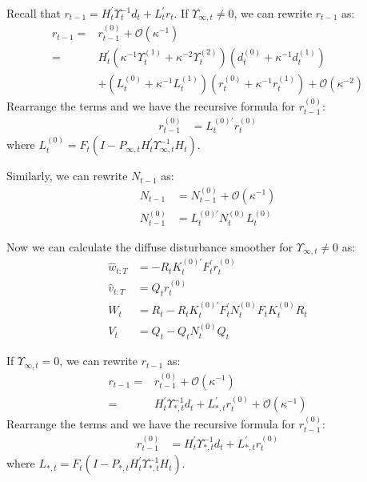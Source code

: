 \documentclass[12pt]{article}
\numberwithin{equation}{section}
\begin{document}
Recall that $r_{t-1} = H_t^{'}\Upsilon_t^{-1}d_t + L_t^{'}r_t$. If $\Upsilon_{\infty,t}\neq0$, we can rewrite $r_{t-1}$ as:
\begin{align*}
    r_{t-1} =& r_{t-1}^{(0)} + \mathcal{O}(\kappa^{-1}) \\
    =& H_t^{'}(\kappa^{-1}\Upsilon_t^{(1)}+\kappa^{-2}\Upsilon_{t}^{(2)})(d_t^{(0)} + \kappa^{-1}d_t^{(1)}) \\
    &+ (L_t^{(0)} + \kappa^{-1}L_t^{(1)})(r_t^{(0)}+\kappa^{-1}r_t^{(1)}) + \mathcal{O}(\kappa^{-2})
\end{align*}
Rearrange the terms and we have the recursive formula for $r_{t-1}^{(0)}$:
\begin{align}
    r_{t-1}^{(0)} &= L_t^{(0)'}r_t^{(0)} \label{eq:diff_disturb1_start}
\end{align}
where $L_t^{(0)}=F_t(I-P_{\infty,t}H_t^{'}\Upsilon_{\infty,t}^{-1}H_t)$.

Similarly, we can rewrite $N_{t-1}$ as:
\begin{align}
    N_{t-1} &= N_{t-1}^{(0)} + \mathcal{O}(\kappa^{-1}) \nonumber \\
    N_{t-1}^{(0)} &= L_t^{(0)'}N_t^{(0)}L_t^{(0)} 
\end{align}

Now we can calculate the diffuse disturbance smoother for $\Upsilon_{\infty,t}\neq0$ as:
\begin{align}
    \hat{w}_{t:T} &= -R_tK_t^{(0)'}F_t^{'}r_t^{(0)} \\
    \hat{v}_{t:T} &= Q_tr_t^{(0)} \\
    W_t &= R_t - R_tK_t^{(0)'}F_t^{'}N_t^{(0)}F_tK_t^{(0)}R_t \\
    V_t &= Q_t - Q_tN_t^{(0)}Q_t \label{eq:diff_disturb1_end}
\end{align}


If $\Upsilon_{\infty,t}=0$, we can rewrite $r_{t-1}$ as:
\begin{align*}
    r_{t-1} =& r_{t-1}^{(0)} + \mathcal{O}(\kappa^{-1}) \\
    =& H_t^{'}\Upsilon_{*,t}^{-1}d_t + L_{*,t}^{'}r_{t}^{(0)} + \mathcal{O}(\kappa^{-1})
\end{align*}
Rearrange the terms and we have the recursive formula for $r_{t-1}^{(0)}$:
\begin{align}
    r_{t-1}^{(0)} &= H_t^{'}\Upsilon_{*,t}^{-1}d_t + L_{*,t}^{'}r_{t}^{(0)} \label{eq:diff_disturb0_start}
\end{align}
where $L_{*,t}=F_t(I-P_{*,t}H_t^{'}\Upsilon_{*,t}^{-1}H_t)$.
\end{document}
